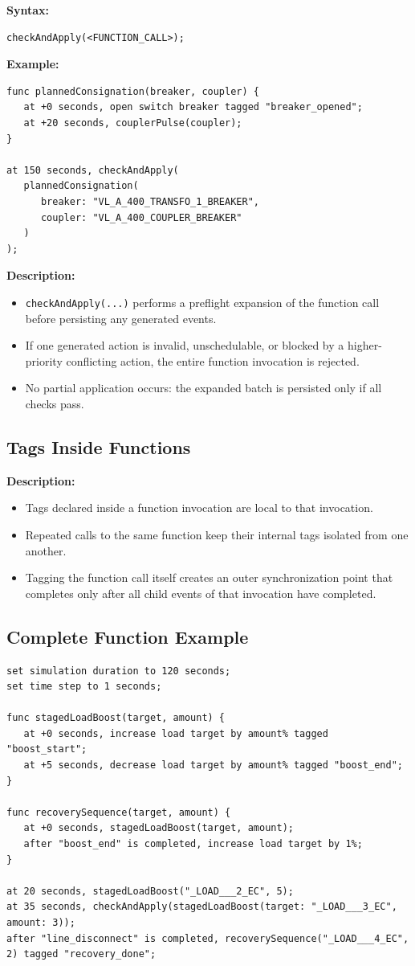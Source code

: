 \documentclass[12pt]{article}
\begin{document}
\textbf{Syntax:}
\begin{lstlisting}
checkAndApply(<FUNCTION_CALL>);
\end{lstlisting}

\textbf{Example:}
\begin{lstlisting}
func plannedConsignation(breaker, coupler) {
   at +0 seconds, open switch breaker tagged "breaker_opened";
   at +20 seconds, couplerPulse(coupler);
}

at 150 seconds, checkAndApply(
   plannedConsignation(
      breaker: "VL_A_400_TRANSFO_1_BREAKER",
      coupler: "VL_A_400_COUPLER_BREAKER"
   )
);
\end{lstlisting}

\textbf{Description:}
\begin{itemize}
  \item \texttt{checkAndApply(...)} performs a preflight expansion of the function call before persisting any
        generated events.
  \item If one generated action is invalid, unschedulable, or blocked by a higher-priority conflicting action, the
        entire function invocation is rejected.
  \item No partial application occurs: the expanded batch is persisted only if all checks pass.
\end{itemize}

\subsection{Tags Inside Functions}

\textbf{Description:}
\begin{itemize}
  \item Tags declared inside a function invocation are local to that invocation.
  \item Repeated calls to the same function keep their internal tags isolated from one another.
  \item Tagging the function call itself creates an outer synchronization point that completes only after all
        child events of that invocation have completed.
\end{itemize}

\subsection{Complete Function Example}

\begin{lstlisting}
set simulation duration to 120 seconds;
set time step to 1 seconds;

func stagedLoadBoost(target, amount) {
   at +0 seconds, increase load target by amount% tagged "boost_start";
   at +5 seconds, decrease load target by amount% tagged "boost_end";
}

func recoverySequence(target, amount) {
   at +0 seconds, stagedLoadBoost(target, amount);
   after "boost_end" is completed, increase load target by 1%;
}

at 20 seconds, stagedLoadBoost("_LOAD___2_EC", 5);
at 35 seconds, checkAndApply(stagedLoadBoost(target: "_LOAD___3_EC", amount: 3));
after "line_disconnect" is completed, recoverySequence("_LOAD___4_EC", 2) tagged "recovery_done";
\end{lstlisting}
\end{document}

